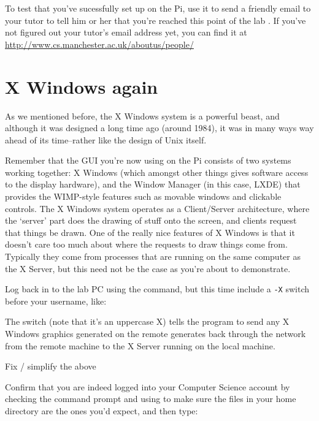 To test that you've sucessfully set  up on the Pi, use it to send a friendly email to your tutor to tell him or her that you're reached this point of the lab . If you've not figured out your tutor's email address yet, you can find it at
\\
\url{http://www.cs.manchester.ac.uk/aboutus/people/}

\section{X Windows again}

As we mentioned before, the X Windows system is a powerful beast, and although it was designed a long time ago (around 1984), it was in many ways way ahead of its time--rather like the design of Unix itself.

Remember that the GUI you're now using on the Pi consists of two systems working together: X Windows (which amongst other things gives software access to the display hardware), and the Window Manager (in this case, LXDE) that provides the WIMP-style features such as movable windows and clickable controls. The X Windows system operates as a Client/Server architecture, where the `server' part does the drawing of stuff onto the screen, and clients request that things be drawn. One of the really nice features of X Windows is that it doesn't care too much about where the requests to draw things come from. Typically they come from processes that are running on the same computer as the X Server, but this need not be the case as you're about to demonstrate.

Log back in to the lab PC using the  command, but this time include a \texttt{-X} switch before your username, like:


The  switch (note that it's an uppercase X) tells the  program to send any X Windows graphics generated on the remote generates back through the network from the remote machine to the X Server running on the local machine.

\begin{note}
Fix / simplify the above
\end{note}

Confirm that you are indeed logged into your Computer Science account by checking the command prompt and using  to make sure the files in your home directory are the ones you'd expect, and then type:

